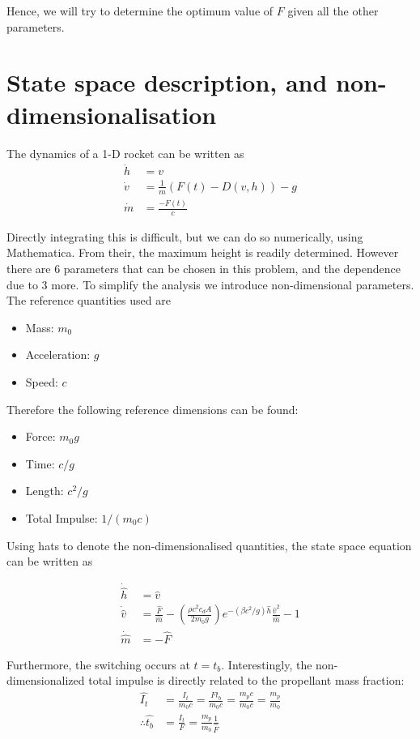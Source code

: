 \documentclass[12pt]{article}
\begin{document}
Hence, we will try to determine the optimum value of $F$ given all the other parameters. 

\section{State space description, and non-dimensionalisation}

The dynamics of a 1-D rocket can be written as
\begin{align} 
\dot{h} &=v \\
\dot{v} &=\frac{1}{m}(F(t)-D(v, h))-g \\
\dot{m} &=\frac{-F(t)}{c} 
\end{align}

Directly integrating this is difficult, but we can do so numerically, using Mathematica. From their, the maximum height is readily determined. However there are 6 parameters that can be chosen in this problem, and the dependence due to 3 more. To simplify the analysis we introduce non-dimensional parameters. The reference quantities used are

\begin{itemize}
\item Mass: $m_0$
\item Acceleration: $g$
\item Speed: $c$
\end{itemize}

Therefore the following reference dimensions can be found:
\begin{itemize}
\item Force: $m_0 g$
\item Time: $c/g$
\item Length: $c^2/g$
\item Total Impulse: $1/(m_0 c)$
\end{itemize}

Using hats to denote the non-dimensionalised quantities, the state space equation can be written as 

\begin{align}
\dot{\hat{h}} &=\hat{v} \\
\dot{\hat v} &=\frac{\hat F}{\hat m}  - \left( \frac{\rho c^2 c_d A}{2 m_0 g} \right) e^{- (\beta c^2/g) \hat h}  \frac{ \hat{v}^2}{\hat m}  - 1 \\
\dot{\hat m} &=-\hat F
\end{align}

Furthermore, the switching occurs at $t = t_b$. Interestingly, the non-dimensionalized total impulse is  directly related to the propellant mass fraction:
\begin{align}
\hat{I_t} &= \frac{I_t}{m_0 c} = \frac{F t_b}{m_0 c} = \frac{m_p c}{m_0 c} = \frac{m_p}{m_0}\\
\therefore \hat{t_b} &= \frac{I_t}{F} = \frac{m_p}{m_0} \frac{1}{\hat F}
\end{align}
\end{document}
